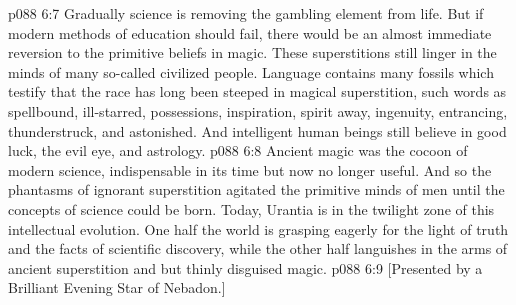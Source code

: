 \vs p088 6:7 Gradually science is removing the gambling element from life. But if modern methods of education should fail, there would be an almost immediate reversion to the primitive beliefs in magic. These superstitions still linger in the minds of many so\hyp{}called civilized people. Language contains many fossils which testify that the race has long been steeped in magical superstition, such words as spellbound, ill\hyp{}starred, possessions, inspiration, spirit away, ingenuity, entrancing, thunderstruck, and astonished. And intelligent human beings still believe in good luck, the evil eye, and astrology.\plusone
\vs p088 6:8 Ancient magic was the cocoon of modern science, indispensable in its time but now no longer useful. And so the phantasms of ignorant superstition agitated the primitive minds of men until the concepts of science could be born. Today, Urantia is in the twilight zone of this intellectual evolution. One half the world is grasping eagerly for the light of truth and the facts of scientific discovery, while the other half languishes in the arms of ancient superstition and but thinly disguised magic.
\vsetoff
\vs p088 6:9 [Presented by a Brilliant Evening Star of Nebadon.]
